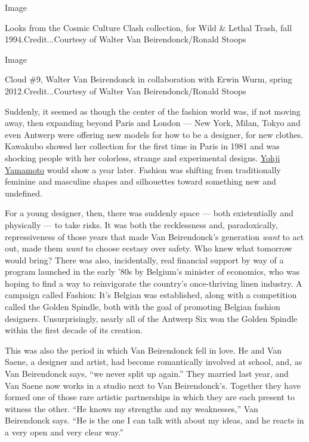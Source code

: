Image

Looks from the Cosmic Culture Clash collection, for Wild \& Lethal
Trash, fall 1994.Credit...Courtesy of Walter Van Beirendonck/Ronald
Stoops

Image

Cloud \#9, Walter Van Beirendonck in collaboration with Erwin Wurm,
spring 2012.Credit...Courtesy of Walter Van Beirendonck/Ronald Stoops

Suddenly, it seemed as though the center of the fashion world was, if
not moving away, then expanding beyond Paris and London --- New York,
Milan, Tokyo and even Antwerp were offering new models for how to be a
designer, for new clothes. Kawakubo showed her collection for the first
time in Paris in 1981 and was shocking people with her colorless,
strange and experimental designs.
\href{https://www.nytimes3xbfgragh.onion/topic/person/yohji-yamamoto}{Yohji
Yamamoto} would show a year later. Fashion was shifting from
traditionally feminine and masculine shapes and silhouettes toward
something new and undefined.

For a young designer, then, there was suddenly space --- both
existentially and physically --- to take risks. It was both the
recklessness and, paradoxically, repressiveness of those years that made
Van Beirendonck's generation \emph{want} to act out, made them
\emph{want} to choose ecstasy over safety. Who knew what tomorrow would
bring? There was also, incidentally, real financial support by way of a
program launched in the early '80s by Belgium's minister of economics,
who was hoping to find a way to reinvigorate the country's once-thriving
linen industry. A campaign called Fashion: It's Belgian was established,
along with a competition called the Golden Spindle, both with the goal
of promoting Belgian fashion designers. Unsurprisingly, nearly all of
the Antwerp Six won the Golden Spindle within the first decade of its
creation.

This was also the period in which Van Beirendonck fell in love. He and
Van Saene, a designer and artist, had become romantically involved at
school, and, as Van Beirendonck says, ``we never split up again.'' They
married last year, and Van Saene now works in a studio next to Van
Beirendonck's. Together they have formed one of those rare artistic
partnerships in which they are each present to witness the other. ``He
knows my strengths and my weaknesses,'' Van Beirendonck says. ``He is
the one I can talk with about my ideas, and he reacts in a very open and
very clear way.''

